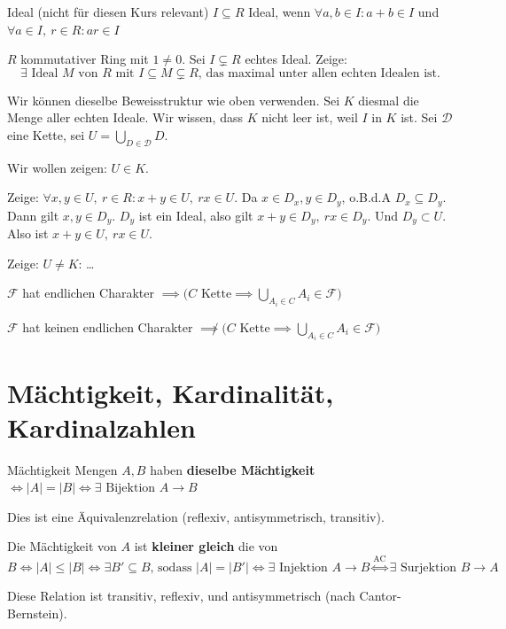 \documentclass[12pt]{article}
\begin{document}
\begin{definition}{Ideal (nicht für diesen Kurs relevant)}{}
    $I \subseteq R$ Ideal, wenn $\forall a, b \in I : a + b \in I$ und $\forall a \in I,\ r \in R : ar \in I$
\end{definition}

\begin{exercise}{}{}
    $R$ kommutativer Ring mit $1 \neq 0$. Sei $I \varsubsetneq R$ echtes Ideal. Zeige:
    $$
        \exists \text{ Ideal } M \text{ von } R \text{ mit } I \subseteq M \varsubsetneq R \text{, das maximal unter allen echten Idealen ist.}
    $$
\end{exercise}

\begin{proofbox}
    Wir können dieselbe Beweisstruktur wie oben verwenden. Sei $K$ diesmal die Menge aller echten Ideale. Wir wissen, dass $K$ nicht leer ist, weil $I$ in $K$ ist. Sei $\mathcal{D}$ eine Kette, sei $U = \bigcup\limits_{D \in \mathcal{D}} D$. 
    
    Wir wollen zeigen: $U \in K$.
    
    Zeige: $\forall x, y \in U,\ r \in R : x + y \in U,\ rx \in U$. Da $x \in D_x, y \in D_y$, o.B.d.A $D_x \subseteq D_y$. Dann gilt $x, y \in D_y$. $D_y$ ist ein Ideal, also gilt $x + y \in D_y,\ rx \in D_y$. Und $D_y \subset U$. Also ist $x + y \in U,\ rx \in U$.

    Zeige: $U \neq K$: \dots
\end{proofbox}

\begin{remark}{}{}
    $\mathcal{F}$ hat endlichen Charakter $\implies \Big( C \text{ Kette} \implies \bigcup\limits_{A_i \in C} A_i \in \mathcal{F} \Big)$
    
    $\mathcal{F}$ hat keinen endlichen Charakter $\not\implies \Big( C \text{ Kette} \implies \bigcup\limits_{A_i \in C} A_i \in \mathcal{F} \Big)$
\end{remark}

\section{Mächtigkeit, Kardinalität, Kardinalzahlen}
\begin{definition}{Mächtigkeit}{}
    Mengen $A, B$ haben \textbf{dieselbe Mächtigkeit} $\iff |A| = |B| \iff \exists \text{ Bijektion } A \rightarrow B$

    Dies ist eine Äquivalenzrelation (reflexiv, antisymmetrisch, transitiv).
    
    Die Mächtigkeit von $A$ ist \textbf{kleiner gleich} die von $B \iff |A| \leq |B| \iff \exists B' \subseteq B \text{, sodass } |A| = |B'| \iff \exists \text{ Injektion } A \rightarrow B \overset{\text{AC}}\iff \exists \text{ Surjektion } B \rightarrow A$

    Diese Relation ist transitiv, reflexiv, und antisymmetrisch (nach Cantor-Bernstein).
\end{definition}
\end{document}
